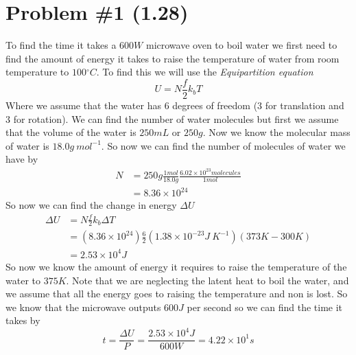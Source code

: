 \documentclass[11pt]{article}
\numberwithin{equation}{section}
\begin{document}


\section{Problem \#1 (1.28)}
To find the time it takes a $600\unit{W}$ microwave oven to boil water we first need to find the amount of energy it takes to raise the temperature of water from room temperature to $100\unit{^{\circ}C}$. To find this we will use the \emph{Equipartition equation}
\begin{equation}
U = N\frac{f}{2}k_bT
\label{equipart}
\end{equation}
Where we assume that the water has 6 degrees of freedom (3 for translation and 3 for rotation). We can find the number of water molecules but first we assume that the volume of the water is $250\unit{mL}$ or $250\unit{g}$. Now we know the molecular mass of water is $18.0\unit{g\ mol^{-1}}$. So now we can find the number of molecules of water we have by
\begin{align*}
N &= 250\unit{g}\frac{1\unit{mol}}{18.0\unit{g}}\frac{6.02\times10^{23}\unit{molecules}}{1\unit{mol}}\\
&= 8.36\times10^{24}
\end{align*}
So now we can find the change in energy $\Delta U$ 
\begin{align*}
\Delta U &= N\frac{f}{2}k_b\Delta T\\
&= (8.36\times10^{24})\frac{6}{2}(1.38\times10^{-23}\unit{J\ K^{-1}})(373\unit{K} - 300\unit{K})\\
&= 2.53\times10^{4}\unit{J}
\end{align*}
So now we know the amount of energy it requires to raise the temperature of the water to $375\unit{K}$. Note that we are neglecting the latent heat to boil the water, and we assume that all the energy goes to raising the temperature and non is lost. So we know that the microwave outputs $600\unit{J}$ per second so we can find the time it takes by
$$t = \frac{\Delta U}{P} = \frac{2.53\times10^{4}\unit{J}}{600\unit{W}} = 4.22\times10^{1}\unit{s}$$
\end{document}
